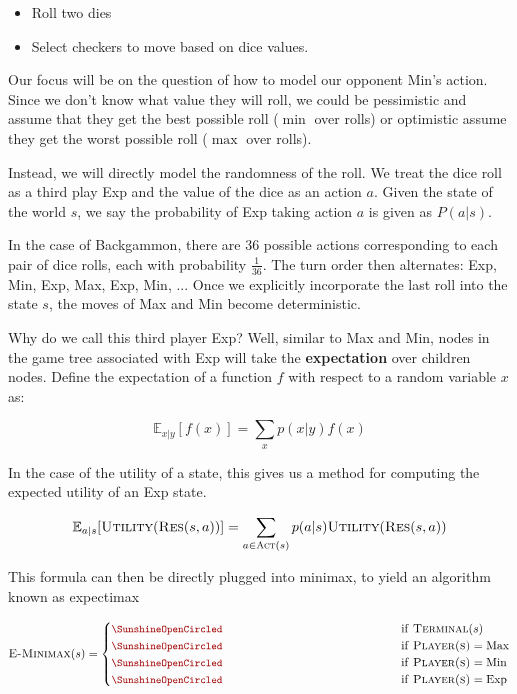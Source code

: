 \documentclass[11pt]{article}
\begin{document}
\begin{itemize}
\item Roll two dies
\item Select checkers to move based on dice values. 
\end{itemize}

Our focus will be on the question of how to model our opponent Min's action. Since we don't know what value they will roll, we could be pessimistic and assume that they get the best possible roll ($\min$ over rolls) or optimistic assume they get the worst possible roll ($\max$ over rolls). 


Instead, we will directly model the randomness of the roll. We treat the dice roll as a third play Exp and the value of the dice as an action $a$. Given the state of the world $s$, we say the probability of Exp taking action $a$ is given as $P(a | s)$. 

In the case of Backgammon, there are $36$ possible actions corresponding to each pair of dice rolls, each with probability $\frac{1}{36}$. The turn order then alternates: Exp, Min, Exp, Max, Exp, Min, ...
Once we explicitly incorporate the last roll into the state $s$, the moves of Max and Min become deterministic.  


Why do we call this third player Exp? Well, similar to Max and Min, nodes in the game tree associated with Exp will take the \textbf{expectation} over children nodes. Define the expectation of a function $f$ with respect to a random variable $x$ as:

\[\mathbb{E}_{x|y}[f(x)] = \sum_{x} p(x|y)f(x) \]

In the case of the utility of a state, this gives us a method for computing the expected utility of an Exp state.




\[ \mathbb{E}_{a|s}[\mathrm{\textsc{Utility}}(\mathrm{\textsc{Res}}(s, a))]= \sum_{a \in \mathrm{\textsc{Act}}(s) } p(a | s) \mathrm{\textsc{Utility}}(\mathrm{\textsc{Res}}(s, a))  \]  

This formula can then be directly plugged into minimax, to yield an algorithm known as expectimax

\[ \msc{E-Minimax}(s) = \begin{cases} 
  \censorm{\msc{Utility}(s)} & \mathrm{if\ } \msc{Terminal}(s)  \\
  \censorm{\max_{a \in \msc{Act}(s) } \msc{E-Minimax}(\msc{Res}(s, a))} & \mathrm{if\ } \msc{Player(s)} = \mathrm{Max}  \\
  \censorm{\min_{a \in \msc{Act}(s) } \msc{E-Minimax}(\msc{Res}(s, a))} & \mathrm{if\ } \msc{Player(s)} = \mathrm{Min} \\ 
  \censorm{\sum_{a \in \msc{Act}(s) } p(a | s) \msc{E-Minimax}(\msc{Res}(s, a))} & \mathrm{if\ } \msc{Player(s)} = \mathrm{Exp} \end{cases}\] 
\end{document}
